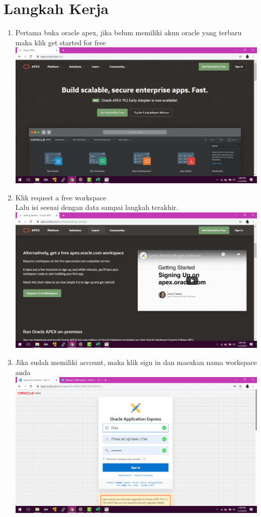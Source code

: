 \clearpage
\setcounter{page}{1}

\section{Langkah Kerja}
\begin{enumerate}

\item Pertama buka oracle apex, jika belum memiliki akun oracle yang terbaru maka klik get started for free\\
\includegraphics[scale= 0.3]{gambar/1.png}\\
\item Klik request a free workspace\\
Lalu isi sesuai dengan data sampai langkah terakhir.\\
\includegraphics[scale= 0.3]{gambar/2.png}\\
\item Jika sudah memiliki account, maka klik sign in dan masukan nama workspace anda\\
\includegraphics[scale= 0.3]{gambar/3.png}\\

\end{enumerate}
